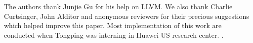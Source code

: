 The authors thank Junjie Gu for his help on LLVM. 
We also thank Charlie Curtsinger, John Alditor and anonymous reviewers for their precious suggestions which helped improve this paper. Most implementation of this work are conducted when Tongping was interning in Huawei US research center. .  
